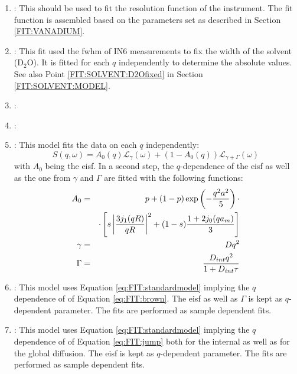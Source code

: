 \begin{enumerate}
	\item {}:  This should be used to fit the resolution function of the instrument. The fit function is assembled based on the parameters set as described in Section \ref{FIT:VANADIUM}.
	\item {}:
	This fit used the \gls{fwhm} of IN6 measurements to fix the width of the solvent (D$_2$O). It is fitted for each $q$ independently to determine the absolute values. See also Point \ref{FIT:SOLVENT:D2Ofixed} in Section \ref{FIT:SOLVENT:MODEL}.
	\item {}:
	\item {}: 
	\item {}: This model fits the data on each $q$ independently:
	\begin{equation}
	S(q,\omega)=A_0(q)\mathscr{L}_\gamma(\omega)+(1-A_0(q))\mathscr{L}_{\gamma+\Gamma}(\omega)\label{eq:FIT:standardmodel}
	\end{equation}
	with $A_0$ being the \gls{eisf}. In a second step, the $q$-dependence of the \gls{eisf} \cite{Grimaldo_2015_PhysChemChemPhys} as well as the one from $\gamma$ and $\Gamma$ \cite{Beck_2018_JPhysChemB} are fitted with the following functions:
	\begin{eqnarray}
	A_0&=&p+(1-p)\exp\left(-\frac{q^2a^2}{5}\right)\cdot\notag\\&&\cdot\left[s\left|\frac{3j_1(qR)}{qR}\right|^2+(1-s)\frac{1+2j_0(qa_m)}{3}\right]\\
	\gamma&=&Dq^2\label{eq:FIT:brown}\\
	\Gamma&=&\frac{D_{int}q^2}{1+D_{int}\tau}\label{eq:FIT:jump}
	\end{eqnarray}
	\item {}: This model uses Equation \ref{eq:FIT:standardmodel} implying the $q$ dependence of of Equation \ref{eq:FIT:brown}. The \gls{eisf} as well as $\Gamma$ is kept as $q$-dependent parameter. The fits are performed as sample dependent fits. 
	\item {}: This model uses Equation \ref{eq:FIT:standardmodel} implying the $q$ dependence of of Equation \ref{eq:FIT:jump} both for the internal as well as for the global diffusion. The \gls{eisf} is kept as $q$-dependent parameter. The fits are performed as sample dependent fits. 

\end{enumerate}
